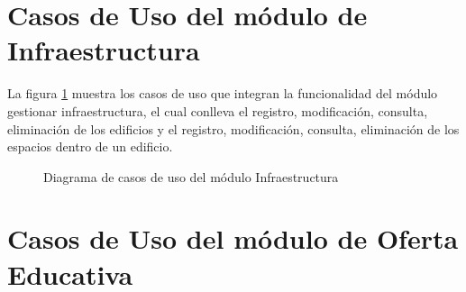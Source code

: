 
\section{Casos de Uso del módulo de Infraestructura}

La figura \ref{fig:casosUso:gestionarInfraestructura} muestra los casos de uso que integran la funcionalidad del módulo gestionar infraestructura, el cual conlleva el registro, modificación, consulta, eliminación de los edificios y el registro, modificación, consulta, eliminación de los espacios dentro de un edificio.
\begin{figure}[htpb!]
	\begin{center}
		\caption{Diagrama de casos de uso del módulo Infraestructura \label{fig:casosUso:gestionarInfraestructura}}
	\end{center}
\end{figure}


\section{Casos de Uso del módulo de Oferta Educativa}

